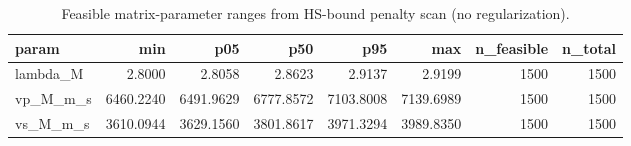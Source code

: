 \begin{table}[ht!]
\centering
\caption{Feasible matrix-parameter ranges from HS-bound penalty scan (no regularization).}
\label{tab:hs\_feasible\_minmax}
\begin{tabular}{lrrrrrrr}
\toprule
\textbf{param} & \textbf{min} & \textbf{p05} & \textbf{p50} & \textbf{p95} & \textbf{max} & \textbf{n\_feasible} & \textbf{n\_total} \\
\midrule
lambda\_M & 2.8000 & 2.8058 & 2.8623 & 2.9137 & 2.9199 & 1500 & 1500 \\
vp\_M\_m\_s & 6460.2240 & 6491.9629 & 6777.8572 & 7103.8008 & 7139.6989 & 1500 & 1500 \\
vs\_M\_m\_s & 3610.0944 & 3629.1560 & 3801.8617 & 3971.3294 & 3989.8350 & 1500 & 1500 \\
\bottomrule
\end{tabular}
\end{table}
